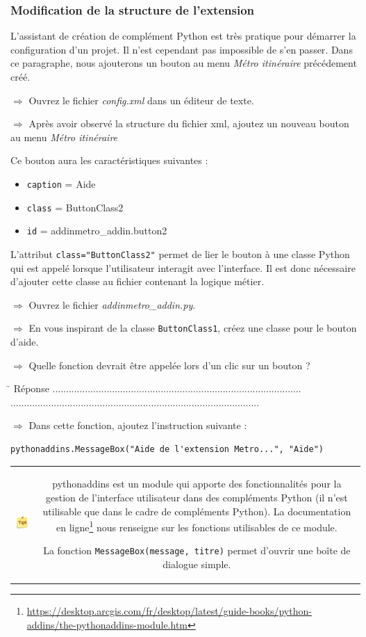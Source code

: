 \documentclass[11pt]{article}
\newcommand{\action}{$\Rightarrow$ }
\newcommand{\reponse}{
	\begin{tabbing}
	\hspace{2cm}\=\kill
	Réponse \> ............................................................................................ \\ 
 	\> ............................................................................................
	\end{tabbing}
}
\newenvironment{note}{%
	\begin{tabular}[t t]{c c}
		\includegraphics{img/tips.png}
		 &
		\begin{minipage}[c]{0.9\linewidth}
			\begin{sffamily}
}{%
			\end{sffamily}
		\end{minipage}
	\end{tabular}	
}
\newcommand{\code}[1]{\lstinline{#1}}
\begin{document}
\subsubsection{Modification de la structure de l'extension}
L'assistant de création de complément Python est très pratique pour démarrer la configuration d'un projet. Il n'est cependant pas impossible de s'en passer. Dans ce paragraphe, nous ajouterons un bouton au menu \textit{Métro itinéraire} précédement créé.

\action Ouvrez le fichier \textit{config.xml} dans un éditeur de texte.

\action Après avoir observé la structure du fichier xml, ajoutez un nouveau bouton au menu \textit{Métro itinéraire}

Ce bouton aura les caractéristiques suivantes :
\begin{itemize}
	\item \code{caption} = Aide
	\item \code{class} = ButtonClass2
	\item \code{id} = addinmetro\_addin.button2
\end{itemize}

L'attribut \code{class="ButtonClass2"} permet de lier le bouton à une classe Python qui est appelé lorsque l'utilisateur interagit avec l'interface. Il est donc nécessaire d'ajouter cette classe au fichier contenant la logique métier.

\action Ouvrez le fichier \textit{addinmetro\_addin.py}.

\action En vous inspirant de la classe \code{ButtonClass1}, créez une classe pour le bouton d'aide.

\action Quelle fonction devrait être appelée lors d'un clic sur un bouton ?

\reponse

\action Dans cette fonction, ajoutez l'instruction suivante :
\begin{lstlisting}
pythonaddins.MessageBox("Aide de l'extension Metro...", "Aide")
\end{lstlisting}

\begin{note}
pythonaddins est un module qui apporte des fonctionnalités pour la gestion de l'interface utilisateur dans des compléments Python (il n'est utilisable que dans le cadre de compléments Python). La documentation en ligne\footnote{\url{https://desktop.arcgis.com/fr/desktop/latest/guide-books/python-addins/the-pythonaddins-module.htm}} nous renseigne sur les fonctions utilisables de ce module.

La fonction \code{MessageBox(message, titre)} permet d'ouvrir une boîte de dialogue simple.
\end{note}
\end{document}

